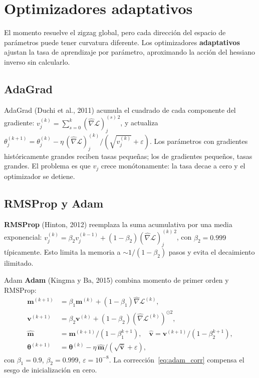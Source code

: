 \section{Optimizadores adaptativos}
\label{sec:adaptativos}


El momento resuelve el zigzag global, pero cada dirección del espacio de
parámetros puede tener curvatura diferente. Los optimizadores
\textbf{adaptativos} ajustan la tasa de aprendizaje por parámetro,
aproximando la acción del hessiano inverso sin calcularlo.

\subsection{AdaGrad}
\label{subsec:adagrad}

AdaGrad (Duchi et al., 2011) acumula el cuadrado de cada componente del
gradiente:
$v_j^{(k)} = \sum_{s=0}^k (\hat{\nabla}\mathcal{L})_j^{(s)\,2}$,
y actualiza $\theta_j^{(k+1)} = \theta_j^{(k)} - \eta\,
(\hat{\nabla}\mathcal{L})_j^{(k)} / (\sqrt{v_j^{(k)}}+\varepsilon)$.
Los parámetros con gradientes históricamente grandes reciben tasas
pequeñas; los de gradientes pequeños, tasas grandes. El problema es que
$v_j$ crece monótonamente: la tasa decae a cero y el optimizador se
detiene.

\subsection{RMSProp y Adam}
\label{subsec:adam}

\textbf{RMSProp} (Hinton, 2012) reemplaza la suma acumulativa por una
media exponencial: $v_j^{(k)} = \beta_2 v_j^{(k-1)} + (1-\beta_2)
(\hat{\nabla}\mathcal{L})_j^{(k)\,2}$, con $\beta_2 = 0.999$
típicamente. Esto limita la memoria a $\sim 1/(1-\beta_2)$ pasos y
evita el decaimiento ilimitado.

\begin{definicion}{Adam}
\label{def:adam}
\textbf{Adam} (Kingma y Ba, 2015) combina momento de primer orden y
RMSProp:
\begin{align}
  \bm{m}^{(k+1)} &= \beta_1\bm{m}^{(k)}
  + (1-\beta_1)\hat{\nabla}\mathcal{L}^{(k)},
  \label{eq:adam_m}\\
  \bm{v}^{(k+1)} &= \beta_2\bm{v}^{(k)}
  + (1-\beta_2)(\hat{\nabla}\mathcal{L}^{(k)})^{\odot 2},
  \label{eq:adam_v}\\
  \hat{\bm{m}} &= \bm{m}^{(k+1)}/(1-\beta_1^{k+1}),
  \quad \hat{\bm{v}} = \bm{v}^{(k+1)}/(1-\beta_2^{k+1}),
  \label{eq:adam_corr}\\
  \bm{\theta}^{(k+1)} &= \bm{\theta}^{(k)}
  - \eta\,\hat{\bm{m}}/(\sqrt{\hat{\bm{v}}}+\varepsilon),
  \label{eq:adam_update}
\end{align}
con $\beta_1 = 0.9$, $\beta_2 = 0.999$, $\varepsilon = 10^{-8}$. La
corrección~\eqref{eq:adam_corr} compensa el sesgo de inicialización
en cero.
\end{definicion}

